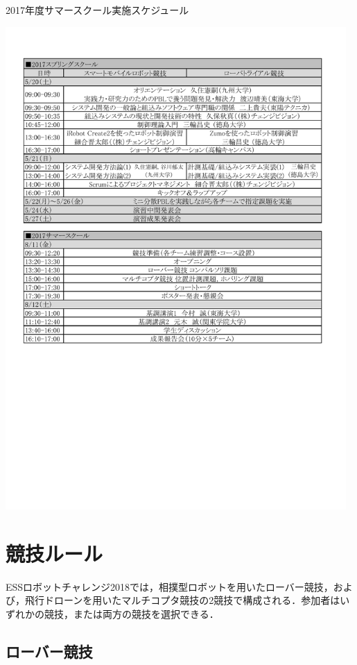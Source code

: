 \documentclass[submit]{ipsj}
\begin{document}
\begin{table}[tb]
\caption{2017年度サマースクール実施スケジュール}
\label{table:suschedule}
\centering
\includegraphics[width=13cm]{images/summertimetable.pdf}
\end{table}


\section{競技ルール}

ESSロボットチャレンジ2018では，相撲型ロボットを用いたローバー競技，および，飛行ドローンを用いたマルチコプタ競技の2競技で構成される．参加者はいずれかの競技，または両方の競技を選択できる．

\subsection{ローバー競技}
\end{document}
